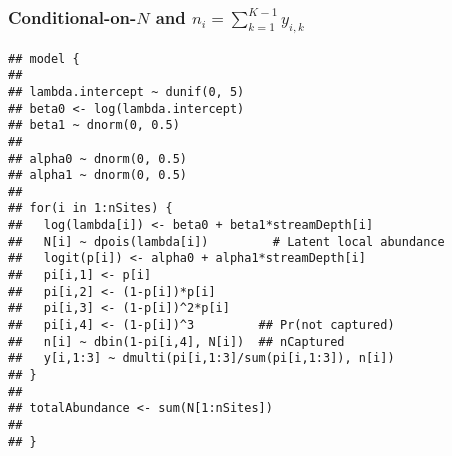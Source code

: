\documentclass[color=usenames,dvipsnames]{beamer}\usepackage[]{graphicx}\usepackage[]{color}
\makeatletter
\newenvironment{kframe}{%
 \def\at@end@of@kframe{}%
 \ifinner\ifhmode%
  \def\at@end@of@kframe{\end{minipage}}%
  \begin{minipage}{\columnwidth}%
 \fi\fi%
 \def\FrameCommand##1{\hskip\@totalleftmargin \hskip-\fboxsep
 \colorbox{shadecolor}{##1}\hskip-\fboxsep
     \hskip-\linewidth \hskip-\@totalleftmargin \hskip\columnwidth}%
 \MakeFramed {\advance\hsize-\width
   \@totalleftmargin\z@ \linewidth\hsize
   \@setminipage}}%
 {\par\unskip\endMakeFramed%
 \at@end@of@kframe}
\newenvironment{knitrout}{}{} %
\makeatother
\begin{document}
\begin{frame}[fragile]
  \frametitle{\normalsize Conditional-on-$N$ and $n_i=\sum_{k=1}^{K-1} y_{i,k}$}
\begin{knitrout}\scriptsize
{}\color{fgcolor}\begin{kframe}
\begin{verbatim}
## model {
## 
## lambda.intercept ~ dunif(0, 5)
## beta0 <- log(lambda.intercept)
## beta1 ~ dnorm(0, 0.5)
## 
## alpha0 ~ dnorm(0, 0.5)  
## alpha1 ~ dnorm(0, 0.5)
## 
## for(i in 1:nSites) {
##   log(lambda[i]) <- beta0 + beta1*streamDepth[i]
##   N[i] ~ dpois(lambda[i])         # Latent local abundance
##   logit(p[i]) <- alpha0 + alpha1*streamDepth[i]
##   pi[i,1] <- p[i]
##   pi[i,2] <- (1-p[i])*p[i]
##   pi[i,3] <- (1-p[i])^2*p[i]
##   pi[i,4] <- (1-p[i])^3         ## Pr(not captured)
##   n[i] ~ dbin(1-pi[i,4], N[i])  ## nCaptured
##   y[i,1:3] ~ dmulti(pi[i,1:3]/sum(pi[i,1:3]), n[i])
## }
## 
## totalAbundance <- sum(N[1:nSites])
## 
## }
\end{verbatim}
\end{kframe}
\end{knitrout}
\end{frame}
\end{document}
